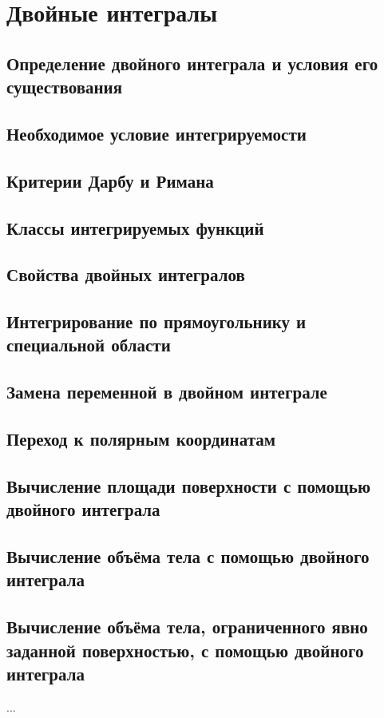 \section{Двойные интегралы}
\subsection{Определение двойного интеграла и условия его существования}
\subsection{Необходимое условие интегрируемости}
\subsection{Критерии Дарбу и Римана}
\subsection{Классы интегрируемых функций}
\subsection{Свойства двойных интегралов}
\subsection{Интегрирование по прямоугольнику и специальной области}
\subsection{Замена переменной в двойном интеграле}
\subsection{Переход к полярным координатам}
\subsection{Вычисление площади поверхности с помощью двойного интеграла}
\subsection{Вычисление объёма тела с помощью двойного интеграла}
\subsection{Вычисление объёма тела, ограниченного явно заданной поверхностью, с помощью двойного интеграла}
...

